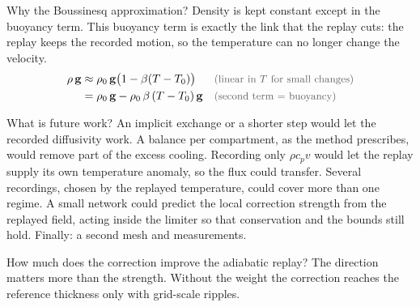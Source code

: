\begin{qabox}{Why the Boussinesq approximation?}
\explain Density is kept constant except in the buoyancy term. This buoyancy term is exactly the
link that the replay cuts: the replay keeps the recorded motion, so the temperature can no longer
change the velocity.
\derive
\begin{align*}
\rho\,\mathbf{g} &\approx \rho_0\,\mathbf{g}\bigl(1 - \beta(T - T_0)\bigr) \why{linear in $T$ for small changes} \\
&= \rho_0\,\mathbf{g} - \rho_0\,\beta\,(T-T_0)\,\mathbf{g} \why{second term = buoyancy}
\end{align*}
\end{qabox}

\begin{qabox}{What is future work?}
\explain An implicit exchange or a shorter step would let the recorded diffusivity work. A balance
per compartment, as the method prescribes, would remove part of the excess cooling. Recording only
$\rho c_p v$ would let the replay supply its own temperature anomaly, so the flux could transfer.
Several recordings, chosen by the replayed temperature, could cover more than one regime. A small
network could predict the local correction strength from the replayed field, acting inside the
limiter so that conservation and the bounds still hold. Finally: a second mesh and measurements.
\end{qabox}

\begin{qabox}{How much does the correction improve the adiabatic replay?}
\explain The direction matters more than the strength. Without the weight the correction reaches
the reference thickness only with grid-scale ripples.
\end{qabox}

